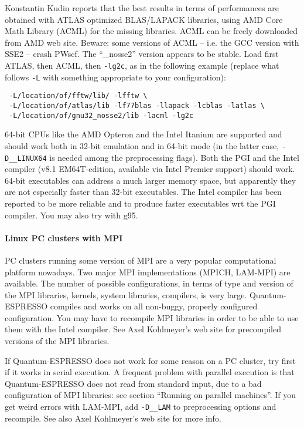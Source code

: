\documentclass[12pt,a4paper]{article}
\begin{document}
Konstantin Kudin reports that the best results in terms of
performances are obtained with ATLAS optimized BLAS/LAPACK 
libraries, using AMD Core Math Library (ACML) for the missing 
libraries. ACML can be freely downloaded from AMD web site.
Beware: some versions of ACML -- i.e. the GCC version with SSE2 -- 
crash PWscf. The ``\_nosse2'' version appears to be stable. 
Load first ATLAS, then ACML, then \texttt{-lg2c}, as in the 
following example (replace what follows \texttt{-L} with 
something appropriate to your configuration):
\begin{verbatim}
 -L/location/of/fftw/lib/ -lfftw \
 -L/location/of/atlas/lib -lf77blas -llapack -lcblas -latlas \
 -L/location/of/gnu32_nosse2/lib -lacml -lg2c
\end{verbatim}
64-bit CPUs like the AMD Opteron and the Intel Itanium are
supported and should work both in 32-bit emulation and in
64-bit mode (in the latter case, \texttt{-D\_\_LINUX64} is 
needed among the preprocessing flags). Both the PGI and the
Intel compiler (v8.1 EM64T-edition, available via Intel Premier 
support) should work. 64-bit executables can address a 
much larger memory space, but apparently they are not especially
faster than 32-bit executables. The Intel compiler has been 
reported to be more reliable and to produce faster executables 
wrt the PGI compiler. You may also try with g95.

\paragraph{Linux PC clusters with MPI}

PC clusters running some version of MPI are a very popular 
computational platform nowadays. Two major MPI implementations 
(MPICH, LAM-MPI) are available. The number of possible
configurations, in terms of type and version of the MPI 
libraries, kernels, system libraries, compilers, is very large. 
Quantum-ESPRESSO compiles and works on all non-buggy, properly configured 
configuration. You may have to recompile MPI libraries in order 
to be able to use them with the Intel compiler. See Axel Kohlmeyer's 
web site for precompiled versions of the MPI libraries.

If Quantum-ESPRESSO does not work for some reason on a PC cluster, try first 
if it works in serial execution. A frequent problem with parallel execution
is that Quantum-ESPRESSO does not read from standard input, due to a bad 
configuration of MPI libraries: see section ``Running on parallel machines''.
If you get weird errors with LAM-MPI, add \texttt{-D\_\_LAM} to preprocessing
options and recompile. See also Axel Kohlmeyer's web site for more info.      
\end{document}
